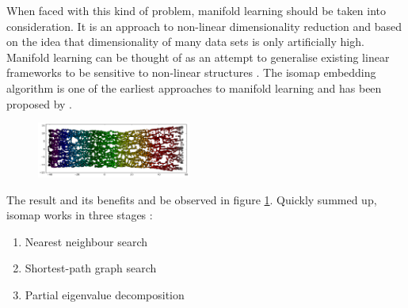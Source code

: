 \vspace{-2mm}
\noindent When faced with this kind of problem, manifold learning should be taken into consideration.
It is an approach to non-linear dimensionality reduction and based on the idea that dimensionality of many data sets is only artificially high.
Manifold learning can be thought of as an attempt to generalise existing linear frameworks to be sensitive to non-linear structures \cite{scikit-learn}.
The isomap embedding algorithm is one of the earliest approaches to manifold learning and has been proposed by .

\begin{figure}
	\centering
	\includegraphics[width=0.45\textwidth]{external_content/graphs/swiss_roll-manifold.png}
	\captionsetup{justification=centering}
	\label{fig:swissrollmanifold}
\end{figure}

\noindent
The result and its benefits and be observed in figure \ref{fig:swissrollmanifold}.
Quickly summed up, isomap works in three stages \cite{scikit-learn}:

\begin{enumerate}
	\vspace{-2mm}
	\item Nearest neighbour search
	\vspace{-2mm}
	\item Shortest-path graph search
	\vspace{-2mm}
	\item Partial eigenvalue decomposition
\end{enumerate}





